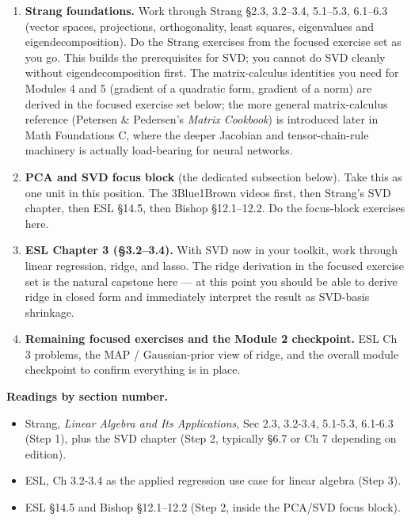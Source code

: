 \begin{enumerate}
\def\labelenumi{\arabic{enumi}.}
\tightlist
\item
  \textbf{Strang foundations.} Work through Strang §2.3, 3.2--3.4,
  5.1--5.3, 6.1--6.3 (vector spaces, projections, orthogonality, least
  squares, eigenvalues and eigendecomposition). Do the Strang exercises
  from the focused exercise set as you go. This builds the prerequisites
  for SVD; you cannot do SVD cleanly without eigendecomposition first.
  The matrix-calculus identities you need for Modules 4 and 5 (gradient
  of a quadratic form, gradient of a norm) are derived in the focused
  exercise set below; the more general matrix-calculus reference
  (Petersen \& Pedersen's \emph{Matrix Cookbook}) is introduced later in
  Math Foundations C, where the deeper Jacobian and tensor-chain-rule
  machinery is actually load-bearing for neural networks.
\item
  \textbf{PCA and SVD focus block} (the dedicated subsection below).
  Take this as one unit in this position. The 3Blue1Brown videos first,
  then Strang's SVD chapter, then ESL §14.5, then Bishop §12.1--12.2. Do
  the focus-block exercises here.
\item
  \textbf{ESL Chapter 3 (§3.2--3.4).} With SVD now in your toolkit, work
  through linear regression, ridge, and lasso. The ridge derivation in
  the focused exercise set is the natural capstone here --- at this
  point you should be able to derive ridge in closed form and
  immediately interpret the result as SVD-basis shrinkage.
\item
  \textbf{Remaining focused exercises and the Module 2 checkpoint.} ESL
  Ch 3 problems, the MAP / Gaussian-prior view of ridge, and the overall
  module checkpoint to confirm everything is in place.
\end{enumerate}

\textbf{Readings by section number.}

\begin{itemize}
\tightlist
\item
  Strang, \emph{Linear Algebra and Its Applications}, Sec 2.3, 3.2-3.4,
  5.1-5.3, 6.1-6.3 (Step 1), plus the SVD chapter (Step 2, typically
  §6.7 or Ch 7 depending on edition).
\item
  ESL, Ch 3.2-3.4 as the applied regression use case for linear algebra
  (Step 3).
\item
  ESL §14.5 and Bishop §12.1--12.2 (Step 2, inside the PCA/SVD focus
  block).
\end{itemize}

